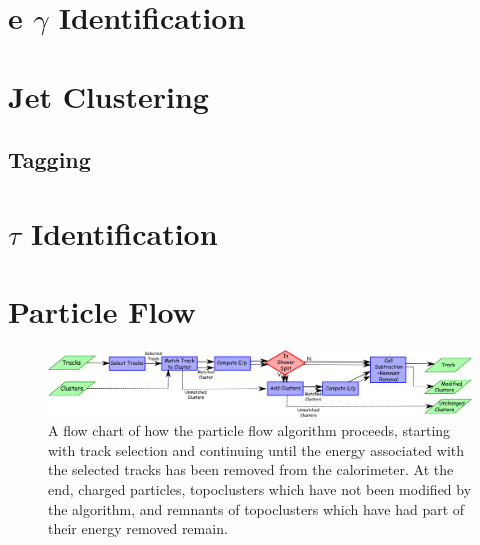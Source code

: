 	\section{e $\gamma$ Identification}\label{sec:reco-egamma}
	\cite{electron-perf}

	\section{Jet Clustering}\label{sec:reco-jets}

		\subsection{\bjet Tagging}\label{ssec:flavor-tagging}

	\section{$\tau$ Identification}\label{ssec:reco-tau}


	\section{\Etm}\label{sec:reco-etmiss}
	\cite{met-perf}

	\section{Particle Flow}\label{sec:pflow}
	\cite{pflow}

	\begin{figure}[!ht]
	\centering
	\includegraphics[width=\textwidth,keepaspectratio=true]{chapters/chapter5_eventreconnstruction/images/pflow_flow_chart.png}
	\caption{\label{fig:pflow} A flow chart of how the particle flow algorithm proceeds, starting with track selection and continuing until the energy associated with the selected tracks has been removed from the calorimeter. At the end, charged particles, topoclusters which have not been modified by the algorithm, and remnants of topoclusters which have had part of their energy removed remain. \cite{pflow}}
	\end{figure}